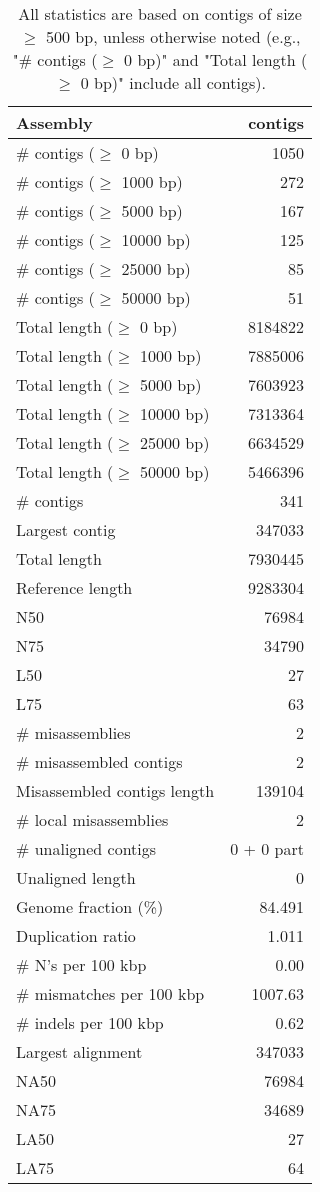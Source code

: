 \documentclass[12pt,a4paper]{article}
\begin{document}
\begin{table}[ht]
\begin{center}
\caption{All statistics are based on contigs of size $\geq$ 500 bp, unless otherwise noted (e.g., "\# contigs ($\geq$ 0 bp)" and "Total length ($\geq$ 0 bp)" include all contigs).}
\begin{tabular}{|l*{1}{|r}|}
\hline
Assembly & contigs \\ \hline
\# contigs ($\geq$ 0 bp) & 1050 \\ \hline
\# contigs ($\geq$ 1000 bp) & 272 \\ \hline
\# contigs ($\geq$ 5000 bp) & 167 \\ \hline
\# contigs ($\geq$ 10000 bp) & 125 \\ \hline
\# contigs ($\geq$ 25000 bp) & 85 \\ \hline
\# contigs ($\geq$ 50000 bp) & 51 \\ \hline
Total length ($\geq$ 0 bp) & 8184822 \\ \hline
Total length ($\geq$ 1000 bp) & 7885006 \\ \hline
Total length ($\geq$ 5000 bp) & 7603923 \\ \hline
Total length ($\geq$ 10000 bp) & 7313364 \\ \hline
Total length ($\geq$ 25000 bp) & 6634529 \\ \hline
Total length ($\geq$ 50000 bp) & 5466396 \\ \hline
\# contigs & 341 \\ \hline
Largest contig & 347033 \\ \hline
Total length & 7930445 \\ \hline
Reference length & 9283304 \\ \hline
N50 & 76984 \\ \hline
N75 & 34790 \\ \hline
L50 & 27 \\ \hline
L75 & 63 \\ \hline
\# misassemblies & 2 \\ \hline
\# misassembled contigs & 2 \\ \hline
Misassembled contigs length & 139104 \\ \hline
\# local misassemblies & 2 \\ \hline
\# unaligned contigs & 0 + 0 part \\ \hline
Unaligned length & 0 \\ \hline
Genome fraction (\%) & 84.491 \\ \hline
Duplication ratio & 1.011 \\ \hline
\# N's per 100 kbp & 0.00 \\ \hline
\# mismatches per 100 kbp & 1007.63 \\ \hline
\# indels per 100 kbp & 0.62 \\ \hline
Largest alignment & 347033 \\ \hline
NA50 & 76984 \\ \hline
NA75 & 34689 \\ \hline
LA50 & 27 \\ \hline
LA75 & 64 \\ \hline
\end{tabular}
\end{center}
\end{table}
\end{document}
